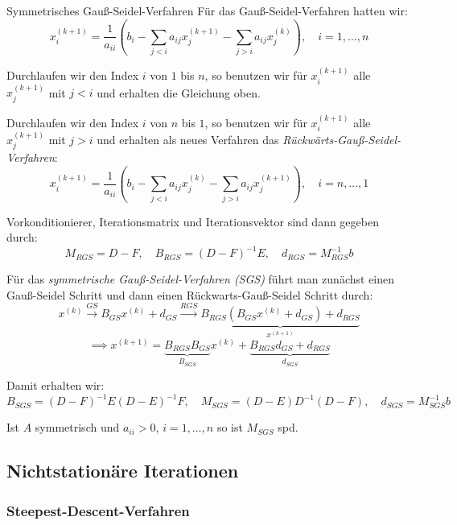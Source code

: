 \begin{defi}{Symmetrisches Gauß-Seidel-Verfahren}
    Für das Gauß-Seidel-Verfahren hatten wir:
    \[
        x_i^{(k+1)} = \frac{1}{a_{ii}} \left( b_i - \sum_{j < i} a_{ij} x_j^{(k+1)} - \sum_{j > i} a_{ij} x_j^{(k)} \right), \quad i = 1, \ldots, n
    \]

    Durchlaufen wir den Index $i$ von $1$ bis $n$, so benutzen wir für $x_i^{(k+1)}$ alle $x_j^{(k+1)}$ mit $j < i$ und erhalten die Gleichung oben.

    Durchlaufen wir den Index $i$ von $n$ bis $1$, so benutzen wir für $x_i^{(k+1)}$ alle $x_j^{(k+1)}$ mit $j > i$ und erhalten als neues Verfahren das \emph{Rückwärts-Gauß-Seidel-Verfahren}:
    \[
        x_i^{(k+1)} = \frac{1}{a_{ii}} \left( b_i - \sum_{j < i} a_{ij} x_j^{(k)} - \sum_{j > i} a_{ij} x_j^{(k+1)} \right), \quad i = n, \ldots, 1
    \]

    Vorkonditionierer, Iterationsmatrix und Iterationsvektor sind dann gegeben durch:
    \[
        M_{RGS} = D - F, \quad B_{RGS} = (D - F)^{-1} E, \quad d_{RGS} = M_{RGS}^{-1} b
    \]

    Für das \emph{symmetrische Gauß-Seidel-Verfahren (SGS)} führt man zunächst einen Gauß-Seidel Schritt und dann einen Rückwarts-Gauß-Seidel Schritt durch:
    \[
        x^{(k)} \xrightarrow{GS} B_{GS} x^{(k)} + d_{GS} \xrightarrow{RGS} \underbrace{ B_{RGS} ( B_{GS} x^{(k)} + d_{GS} ) + d_{RGS} }_{x^{(k+1)}}
    \]
    \[
        \implies x^{(k+1)} = \underbrace{ B_{RGS} B_{GS} }_{B_{SGS}} x^{(k)} + \underbrace{ B_{RGS} d_{GS} + d_{RGS} }_{d_{SGS}}
    \]

    Damit erhalten wir:
    \[
        B_{SGS} = (D - F)^{-1} E (D-E)^{-1} F, \quad M_{SGS} = (D - E) D^{-1} (D-F), \quad d_{SGS} = M^{-1}_{SGS} b
    \]

    Ist $A$ symmetrisch und $a_{ii} > 0$, $i = 1, \ldots, n$ so ist $M_{SGS}$ spd.
\end{defi}

\subsection{Nichtstationäre Iterationen}

\subsubsection{Steepest-Descent-Verfahren}

